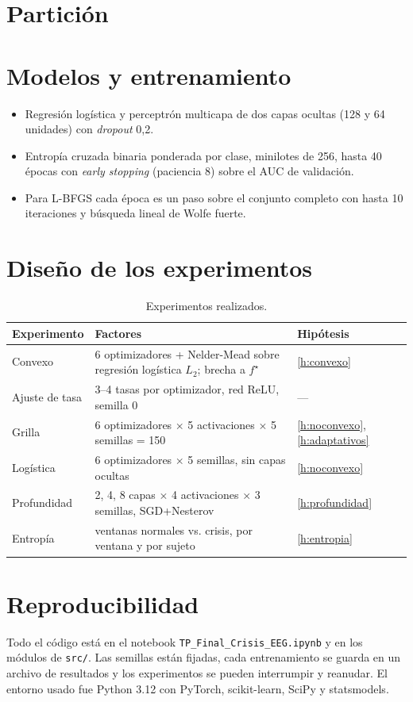 \section{Partición}


\section{Modelos y entrenamiento}

\begin{itemize}
  \item Regresión logística y perceptrón multicapa de dos capas ocultas (128 y 64 unidades) con \emph{dropout} 0,2.
  \item Entropía cruzada binaria ponderada por clase, minilotes de 256, hasta 40 épocas con \emph{early stopping} (paciencia 8) sobre el AUC de validación.
  \item Para L-BFGS cada época es un paso sobre el conjunto completo con hasta 10 iteraciones y búsqueda lineal de Wolfe fuerte.
\end{itemize}

\section{Diseño de los experimentos}

\begin{table}[ht]
\centering
\caption{Experimentos realizados.}
\label{tab:experimentos}
\begin{tabularx}{\linewidth}{@{}lXl@{}}
\toprule
Experimento & Factores & Hipótesis \\
\midrule
Convexo & 6 optimizadores + Nelder-Mead sobre regresión logística $L_2$; brecha a $f^\star$ & \ref{h:convexo} \\
Ajuste de tasa & 3--4 tasas por optimizador, red ReLU, semilla 0 & --- \\
Grilla & 6 optimizadores $\times$ 5 activaciones $\times$ 5 semillas = 150 & \ref{h:noconvexo}, \ref{h:adaptativos} \\
Logística & 6 optimizadores $\times$ 5 semillas, sin capas ocultas & \ref{h:noconvexo} \\
Profundidad & 2, 4, 8 capas $\times$ 4 activaciones $\times$ 3 semillas, SGD+Nesterov & \ref{h:profundidad} \\
Entropía & ventanas normales vs. crisis, por ventana y por sujeto & \ref{h:entropia} \\
\bottomrule
\end{tabularx}
\end{table}

\section{Reproducibilidad}

Todo el código está en el notebook \texttt{TP\_Final\_Crisis\_EEG.ipynb} y en los módulos de \texttt{src/}. Las semillas están fijadas, cada entrenamiento se guarda en un archivo de resultados y los experimentos se pueden interrumpir y reanudar. El entorno usado fue Python 3.12 con PyTorch, scikit-learn, SciPy y statsmodels.
